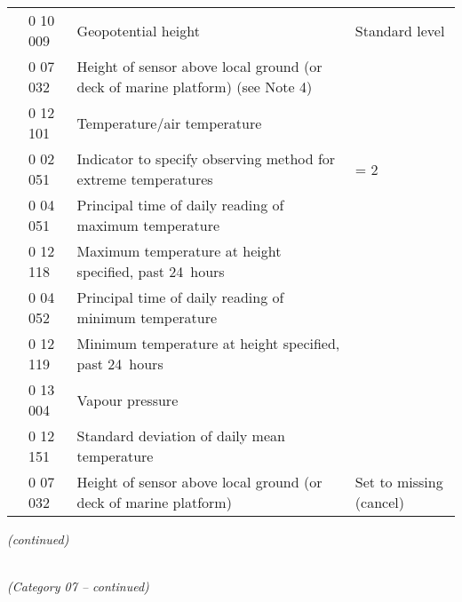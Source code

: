 \begin{longtable}[]{@{}llll@{}}
& 0 10 009 & Geopotential height & Standard level\tabularnewline
& 0 07 032 & Height of sensor above local ground (or deck of marine platform) (see Note 4) &\tabularnewline
& 0 12 101 & Temperature/air temperature &\tabularnewline
& 0 02 051 & Indicator to specify observing method for extreme temperatures & = 2\tabularnewline
& 0 04 051 & Principal time of daily reading of maximum temperature &\tabularnewline
& 0 12 118 & Maximum temperature at height specified, past 24~hours &\tabularnewline
& 0 04 052 & Principal time of daily reading of minimum temperature &\tabularnewline
& 0 12 119 & Minimum temperature at height specified, past 24~hours &\tabularnewline
& 0 13 004 & Vapour pressure &\tabularnewline
& 0 12 151 & Standard deviation of daily mean temperature &\tabularnewline
& 0 07 032 & Height of sensor above local ground (or deck of marine platform) & Set to missing (cancel)\tabularnewline
\bottomrule
\end{longtable}

\emph{(continued)}

\emph{\\
(Category 07 -- continued)}


